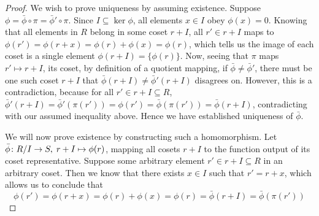 \begin{proof}
    We wish to prove uniqueness by assuming existence.
    Suppose \(\phi = \bar{\phi}\circ\pi = \bar{\phi}'\circ\pi\).
    Since \(I \subseteq \ker\phi\),
    all elements \(x \in I\) obey \(\phi(x) = 0\).
    Knowing that all elements in \(R\) belong in some coset \(r+I\),
    all \(r' \in r+I\) maps to \(\phi(r') = \phi(r+x) = \phi(r)+\phi(x) = \phi(r)\),
    which tells us the image of each coset
    is a single element \(\phi(r+I) = \{\phi(r)\}\).
    Now, seeing that \(\pi \) maps \(r' \mapsto r+I\), its coset,
    by definition of a quotient mapping,
    if \(\bar{\phi} \neq \bar{\phi}'\),
    there must be one such coset \(r+I\)
    that \(\bar{\phi}(r+I) \neq \bar{\phi}'(r+I)\) disagrees on.
    However, this is a contradiction,
    because for all \(r' \in r+I \subseteq R\),
    \(\bar{\phi}'(r+I) = \bar{\phi}'(\pi(r')) = \phi(r')
    = \bar{\phi}(\pi(r')) = \bar{\phi}(r+I)\),
    contradicting with our assumed inequality above.
    Hence we have established uniqueness of \(\bar{\phi}\).

    We will now prove existence by constructing such a homomorphism.
    Let \(\bar{\phi}\colon R/I\to S,\;r+I\mapsto\phi(r)\),
    mapping all cosets \(r+I\) to the function output of its coset representative.
    Suppose some arbitrary element \(r' \in r+I \subseteq R\)
    in an arbitrary coset.
    Then we know that there exists \(x \in I\) such that \(r' = r+x\),
    which allows us to conclude that
    \begin{equation*}
        \phi(r') = \phi(r+x) = \phi(r) + \phi(x)
        = \phi(r) = \bar{\phi}(r+I) = \bar{\phi}(\pi(r'))
    \end{equation*}
\end{proof}

